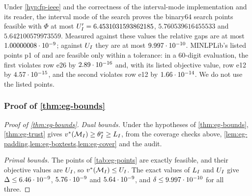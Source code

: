 Under \cref{hyp:fp-ieee} and the correctness of the interval-mode implementation and its reader, the interval mode of the search proves the binary64 search points feasible with $\Phi$ at most $U'_I=6.4531031593862185$, $5.760539616455533$ and $5.642100579973559$.
Measured against these values the relative gaps are at most $1.00000008\cdot 10^{-9}$; against $U_I$ they are at most $9.997\cdot 10^{-10}$.
MINLPLib's listed points p1 of  and  are feasible only within a tolerance: in a 60-digit evaluation, the first violates row e26 by $2.89\cdot 10^{-16}$ and, with its listed objective value, row e12 by $4.57\cdot 10^{-15}$, and the second violates row e12 by $1.66\cdot 10^{-14}$.
We do not use the listed points.

\subsubsection{Proof of \texorpdfstring{\cref{thm:eg-bounds}}{the eg theorem}}\label{app:eg-proof}

\begin{proof}[Proof of \cref{thm:eg-bounds}]
\emph{Dual bounds.}
Under the hypotheses of \cref{thm:eg-bounds}, \cref{thm:eg-trust} gives $v^{*}(\mathcal{M}_I)\ge\theta^*_I\ge L_I$, from the coverage checks above, \cref{lem:eg-padding,lem:eg-boxtests,lem:eg-cover} and the audit.

\emph{Primal bounds.}
The points of \cref{tab:eg-points} are exactly feasible, and their objective values are $U_I$, so $v^{*}(\mathcal{M}_I)\le U_I$.
The exact values of $L_I$ and $U_I$ give $\Delta\le6.46\cdot 10^{-9}$, $5.76\cdot 10^{-9}$ and $5.64\cdot 10^{-9}$, and $\delta\le9.997\cdot 10^{-10}$ for all three.
\end{proof}

